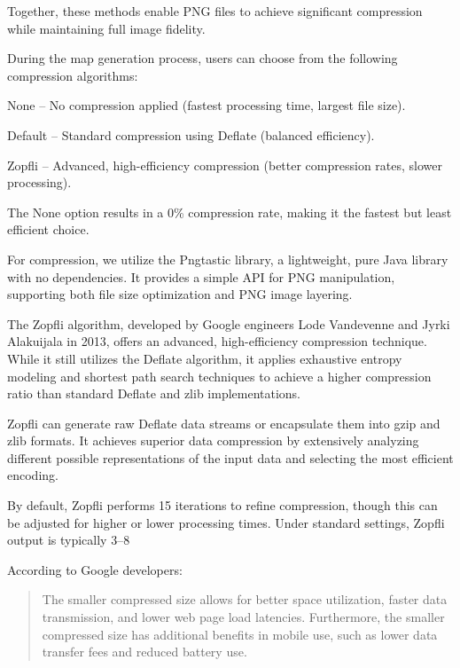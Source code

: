 Together, these methods enable PNG files to achieve significant compression while maintaining full image fidelity.

During the map generation process, users can choose from the following compression algorithms:

\begin{compactitem}
    
\item{}None – No compression applied (fastest processing time, largest file size).
\item{}Default – Standard compression using Deflate (balanced efficiency).
\item{}Zopfli – Advanced, high-efficiency compression (better compression rates, slower processing).
\end{compactitem}

The None option results in a 0\% compression rate, making it the fastest but least efficient choice.

For compression, we utilize the Pngtastic library, a lightweight, pure Java library with no dependencies. It provides a simple API for PNG manipulation, supporting both file size optimization and PNG image layering.

The Zopfli algorithm, developed by Google engineers Lode Vandevenne and Jyrki Alakuijala in 2013, offers an advanced, high-efficiency compression technique. While it still utilizes the Deflate algorithm, it applies exhaustive entropy modeling and shortest path search techniques to achieve a higher compression ratio than standard Deflate and zlib implementations.

Zopfli can generate raw Deflate data streams or encapsulate them into gzip and zlib formats. It achieves superior data compression by extensively analyzing different possible representations of the input data and selecting the most efficient encoding.

By default, Zopfli performs 15 iterations to refine compression, though this can be adjusted for higher or lower processing times. Under standard settings, Zopfli output is typically 3–8%

According to Google developers: \cite{ZopfliGoogleBlog}

\begin{quote}
    The smaller compressed size allows for better space utilization, faster data transmission, and lower web page load latencies. Furthermore, the smaller compressed size has additional benefits in mobile use, such as lower data transfer fees and reduced battery use.
\end{quote}

